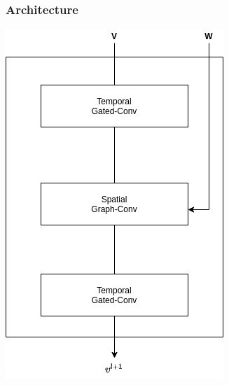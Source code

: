 \documentclass{beamer}
\begin{document}
\begin{frame}
  \frametitle{Architecture}
  \centering
  \includegraphics[height=\textheight]{img/inner-blocks.png}
\end{frame}
\end{document}
